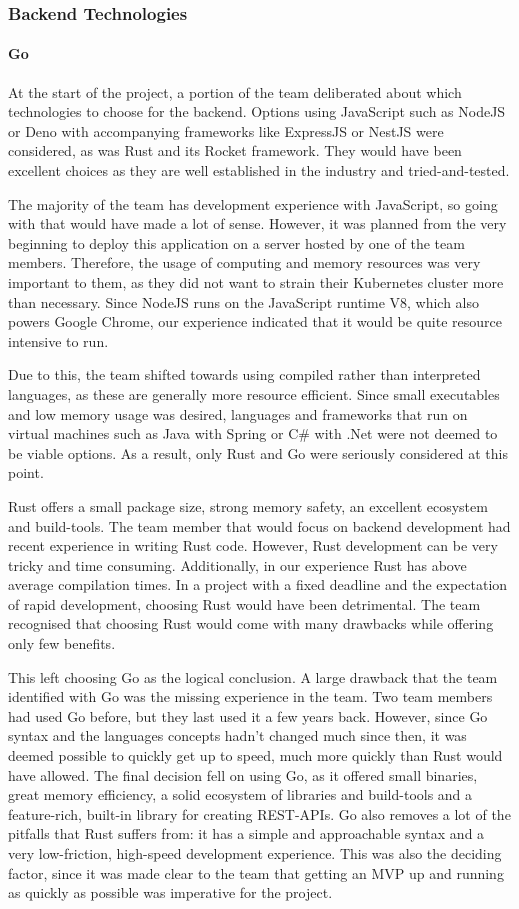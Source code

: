 \subsubsection{Backend Technologies}
\paragraph{Go}
At the start of the project, a portion of the team deliberated about which
technologies to choose for the backend. Options using JavaScript such as NodeJS
or Deno with accompanying frameworks like ExpressJS or NestJS were considered,
as was Rust and its Rocket framework. They would have been excellent choices as
they are well established in the industry and tried-and-tested.

The majority of the team has development experience with JavaScript, so going
with that would have made a lot of sense. However, it was planned from the very
beginning to deploy this application on a server hosted by one of the team
members. Therefore, the usage of computing and memory resources was very
important to them, as they did not want to strain their Kubernetes cluster more
than necessary. Since NodeJS runs on the JavaScript runtime V8, which also
powers Google Chrome, our experience indicated that it would be quite resource
intensive to run.

Due to this, the team shifted towards using compiled rather than interpreted
languages, as these are generally more resource efficient. Since small
executables and low memory usage was desired, languages and frameworks that run
on virtual machines such as Java with Spring or C\# with .Net were not deemed to
be viable options. As a result, only Rust and Go were seriously considered at
this point.

Rust offers a small package size, strong memory safety, an excellent
ecosystem and build-tools. The team member that would focus on backend
development had recent experience in writing Rust code. However, Rust
development can be very tricky and time consuming. Additionally, in our
experience Rust has above average compilation times. In a project with a fixed
deadline and the expectation of rapid development, choosing Rust would have been
detrimental. The team recognised that choosing Rust would come with many
drawbacks while offering only few benefits.

This left choosing Go as the logical conclusion. A large drawback that the team
identified with Go was the missing experience in the team. Two team members had
used Go before, but they last used it a few years back. However, since Go syntax
and the languages concepts hadn't changed much since then, it was deemed
possible to quickly get up to speed, much more quickly than Rust would have
allowed. The final decision fell on using Go, as it offered small binaries,
great memory efficiency, a solid ecosystem of libraries and build-tools and a
feature-rich, built-in library for creating REST-APIs. Go also removes a lot of
the pitfalls that Rust suffers from: it has a simple and approachable syntax and
a very low-friction, high-speed development experience. This was also the
deciding factor, since it was made clear to the team that getting an MVP up and
running as quickly as possible was imperative for the project.

